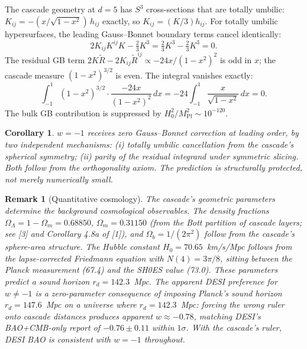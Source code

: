 \documentclass[12pt,a4paper]{article}
\newtheorem{corollary}[theorem]{Corollary}
\newtheorem*{remark}{Remark}
\begin{document}
The cascade geometry at $d = 5$ has $S^3$ cross-sections that are totally umbilic: $K_{ij} =
-(x/\sqrt{1 - x^2})\,h_{ij}$ exactly, so $K_{ij} = (K/3)h_{ij}$. For totally umbilic hypersurfaces, the leading
Gauss--Bonnet boundary terms cancel identically:
\[
2K_{ij}K^{ij}K - \tfrac{2}{3}K^3 = \tfrac{2}{3}K^3 - \tfrac{2}{3}K^3 = 0.
\]
The residual GB term $2K\tilde{R} - 2K_{ij}\tilde{R}^{ij} \propto -24x/(1 - x^2)^2$ is odd in $x$; the cascade measure
$(1 - x^2)^{3/2}$ is even. The integral vanishes exactly:
\[
\int_{-1}^{1} (1 - x^2)^{3/2} \cdot \frac{-24x}{(1 - x^2)^2}\,dx = -24\int_{-1}^{1} \frac{x}{\sqrt{1 - x^2}}\,dx = 0.
\]
The bulk GB contribution is suppressed by $H_0^2/M_{\text{Pl}}^2 \sim 10^{-120}$.

\begin{corollary}
$w = -1$ receives zero Gauss--Bonnet correction at leading order, by two
independent mechanisms: (i) totally umbilic cancellation from the cascade's spherical
symmetry; (ii) parity of the residual integrand under symmetric slicing. Both follow from
the orthogonality axiom. The prediction is structurally protected, not merely numerically
small.
\end{corollary}

\begin{remark}[Quantitative cosmology]
The cascade's geometric parameters determine the
background cosmological observables. The density fractions $\Omega_\Lambda = 1 - \Omega_m = 0.68850$, $\Omega_m = 0.31150$
(from the Bott partition of cascade layers; see [3] and Corollary 4.8a of [1]), and $\Omega_b =
1/(2\pi^2)$ follow from the cascade's sphere-area structure. The Hubble constant $H_0 = 70.65$~km/s/Mpc follows from the lapse-corrected Friedmann equation with $N(4) = 3\pi/8$, sitting
between the Planck measurement (67.4) and the SH0ES value (73.0). These parameters
predict a sound horizon $r_d = 142.3$~Mpc. The apparent DESI preference for $w \neq -1$ is
a zero-parameter consequence of imposing Planck's sound horizon $r_d = 147.6$~Mpc on a
universe where $r_d = 142.3$~Mpc: forcing the wrong ruler onto cascade distances produces
apparent $w \approx -0.78$, matching DESI's BAO+CMB-only report of $-0.76 \pm 0.11$ within $1\sigma$.
With the cascade's ruler, DESI BAO is consistent with $w = -1$ throughout.
\end{remark}
\end{document}
